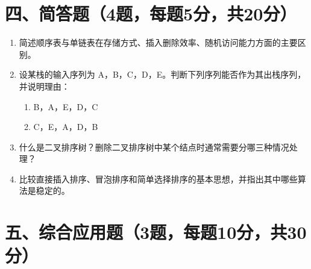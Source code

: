 \documentclass{../../note}
\begin{document}
\section*{四、简答题（4题，每题5分，共20分）}

\begin{enumerate}[itemsep=1em]
\item 简述顺序表与单链表在存储方式、插入删除效率、随机访问能力方面的主要区别。
\item 设某栈的输入序列为 A，B，C，D，E。判断下列序列能否作为其出栈序列，并说明理由：
\begin{enumerate}[label=(\arabic*)]
\item B，A，E，D，C
\item C，E，A，D，B
\end{enumerate}
\item 什么是二叉排序树？删除二叉排序树中某个结点时通常需要分哪三种情况处理？
\item 比较直接插入排序、冒泡排序和简单选择排序的基本思想，并指出其中哪些算法是稳定的。
\end{enumerate}

\section*{五、综合应用题（3题，每题10分，共30分）}
\end{document}
